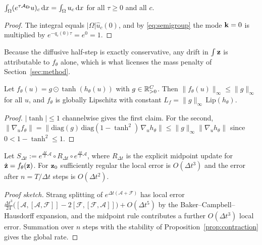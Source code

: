 \begin{proposition}
\label{prop:mass}
$\int_\Omega (e^{\tau\mathcal{A}_{\mathbf{D}}}u)_c \,\mathrm{d} x = \int_\Omega u_c\,\mathrm{d} x$
for all $\tau\ge0$ and all $c$.
\end{proposition}

\begin{proof}
The integral equals $|\Omega|\hat u_c(0)$, and by \eqref{eq:semigroup} the mode
$\mathbf{k}=0$ is multiplied by $e^{-q_c(0)\tau}=e^0=1$.
\end{proof}

Because the diffusive half-step is exactly conservative, any drift in
$\int\mathbf{z}$ is attributable to $f_\theta$ alone, which is what licenses the mass
penalty of Section~\ref{sec:method}.

\begin{proposition}
\label{prop:reaction}
Let $f_\theta(u) = g \odot \tanh(h_\theta(u))$ with $g\in\mathbb{R}_{>0}^C$. Then
$\|f_\theta(u)\|_\infty \le \|g\|_\infty$ for all $u$, and $f_\theta$ is globally
Lipschitz with constant $L_f = \|g\|_\infty \,\mathrm{Lip}(h_\theta)$.
\end{proposition}

\begin{proof}
$|\tanh|\le1$ channelwise gives the first claim. For the second,
$\|\nabla_u f_\theta\| = \|\mathrm{diag}(g)\,\mathrm{diag}(1-\tanh^2)\,
\nabla_u h_\theta\| \le \|g\|_\infty \|\nabla_u h_\theta\|$ since
$0<1-\tanh^2\le1$.
\end{proof}

\begin{proposition}
\label{prop:order}
Let $S_{\Delta t} := e^{\frac{\Delta t}{2}\mathcal{A}}\circ R_{\Delta t}\circ
e^{\frac{\Delta t}{2}\mathcal{A}}$, where $R_{\Delta t}$ is the explicit midpoint
update for $\dot{\mathbf{z}}=f_\theta(\mathbf{z})$. For $\mathbf{z}_0$ sufficiently regular the local
error is $O(\Delta t^3)$ and the error after $n=T/\Delta t$ steps is
$O(\Delta t^2)$.
\end{proposition}

\begin{proof}[Proof sketch]
Strang splitting of $e^{\Delta t(\mathcal{A}+\mathcal{F})}$ has local error
$\tfrac{\Delta t^3}{24}\big([\mathcal{A},[\mathcal{A},\mathcal{F}]]
- 2[\mathcal{F},[\mathcal{F},\mathcal{A}]]\big)+O(\Delta t^5)$ by the
Baker--Campbell--Hausdorff expansion, and the midpoint rule contributes a further
$O(\Delta t^3)$ local error. Summation over $n$ steps with the stability of
Proposition~\ref{prop:contraction} gives the global rate.
\end{proof}

